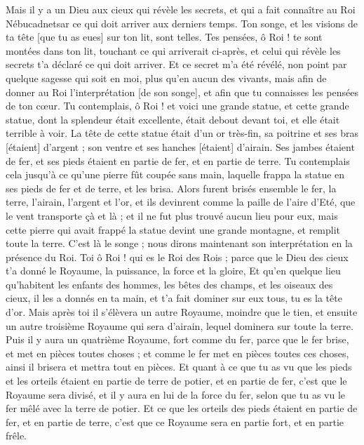\begin{multicols}{2}
Mais il y a un Dieu aux cieux qui révèle les secrets, et qui a fait connaître au Roi Nébucadnetsar ce qui doit arriver aux derniers temps. Ton songe, et les visions de ta tête [que tu as eues] sur ton lit, sont telles.
Tes pensées, ô Roi ! te sont montées dans ton lit, touchant ce qui arriverait ci-après, et celui qui révèle les secrets t'a déclaré ce qui doit arriver.
Et ce secret m'a été révélé, non point par quelque sagesse qui soit en moi, plus qu'en aucun des vivants, mais afin de donner au Roi l'interprétation [de son songe], et afin que tu connaisses les pensées de ton cœur.
Tu contemplais, ô Roi ! et voici une grande statue, et cette grande statue, dont la splendeur était excellente, était debout devant toi, et elle était terrible à voir.
La tête de cette statue était d'un or très-fin, sa poitrine et ses bras [étaient] d'argent ; son ventre et ses hanches [étaient] d'airain.
Ses jambes étaient de fer, et ses pieds étaient en partie de fer, et en partie de terre.
Tu contemplais cela jusqu'à ce qu'une pierre fût coupée sans main, laquelle frappa la statue en ses pieds de fer et de terre, et les brisa.
Alors furent brisés ensemble le fer, la terre, l'airain, l'argent et l'or, et ils devinrent comme la paille de l'aire d'Eté, que le vent transporte çà et là ; et il ne fut plus trouvé aucun lieu pour eux, mais cette pierre qui avait frappé la statue devint une grande montagne, et remplit toute la terre.
C'est là le songe ; nous dirons maintenant son interprétation en la présence du Roi.
Toi ô Roi ! qui es le Roi des Rois ; parce que le Dieu des cieux t'a donné le Royaume, la puissance, la force et la gloire,
Et qu'en quelque lieu qu'habitent les enfants des hommes, les bêtes des champs, et les oiseaux des cieux, il les a donnés en ta main, et t'a fait dominer sur eux tous, tu es la tête d'or.
Mais après toi il s'élèvera un autre Royaume, moindre que le tien, et ensuite un autre troisième Royaume qui sera d'airain, lequel dominera sur toute la terre.
Puis il y aura un quatrième Royaume, fort comme du fer, parce que le fer brise, et met en pièces toutes choses ; et comme le fer met en pièces toutes ces choses, ainsi il brisera et mettra tout en pièces.
Et quant à ce que tu as vu que les pieds et les orteils étaient en partie de terre de potier, et en partie de fer, c'est que le Royaume sera divisé, et il y aura en lui de la force du fer, selon que tu as vu le fer mêlé avec la terre de potier.
Et ce que les orteils des pieds étaient en partie de fer, et en partie de terre, c'est que ce Royaume sera en partie fort, et en partie frêle.

\end{multicols}
